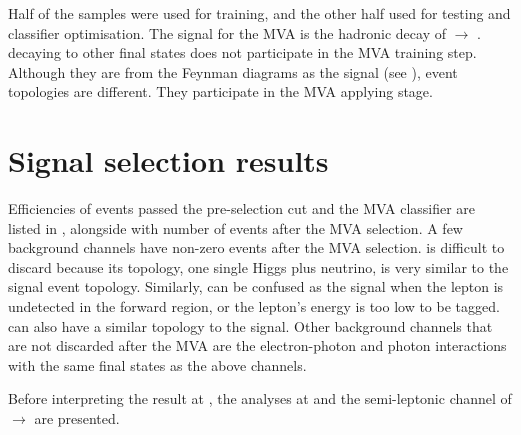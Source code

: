Half of the samples were used for training, and the other half used for testing and classifier optimisation. The signal for the MVA is the hadronic decay of \eeToHH $\to$ \HepProcess{ \Pbottom \APbottom \PWplus \PWminus \Pnue \APnue}. \eeToHH decaying to other final states does not participate in the MVA training step. Although they are from the Feynman diagrams as the signal (see ), event topologies are different. They participate in the MVA applying stage.

\section{Signal selection results}
\label{sec:doubleHiggsSignalSelResult}

Efficiencies of events passed the pre-selection cut and the MVA classifier are listed in , alongside with number of events after the MVA selection. A few  background channels have non-zero events after the MVA selection. \eeTo{\Pquark \APquark \PHiggs \Pnu \APnu} is difficult to discard because its topology, one single Higgs plus neutrino, is very similar to the signal event topology. Similarly, \eeTo{ \Pquark \Pquark \Pquark \Pquark \Plepton \Pnu} can be confused as the signal when the lepton is undetected in the forward region, or the lepton's energy is too low to be tagged. \eeTo{ \Pquark \Pquark \Pquark \Pquark \Pnu \APnu} can also have a similar topology to the signal. Other background channels that are not discarded after the MVA are the electron-photon and photon interactions with the same final states as the above channels.



Before interpreting the result at , the analyses at  and  the semi-leptonic channel of \eeToHH $\to$ \HepProcess{ \Pbottom \APbottom \PWplus \PWminus \Pnue \APnue} are presented.

